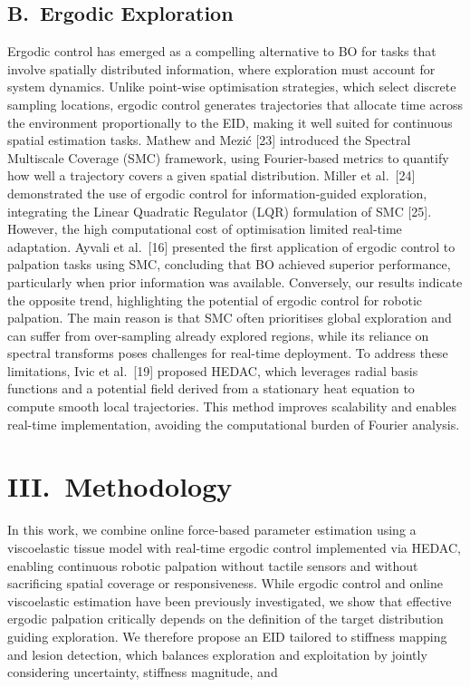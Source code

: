 \documentclass[11pt]{article}
\begin{document}
\subsection*{B.\ Ergodic Exploration}

Ergodic control has emerged as a compelling alternative to BO for
tasks that involve spatially distributed information, where
exploration must account for system dynamics. Unlike point-wise
optimisation strategies, which select discrete sampling locations,
ergodic control generates trajectories that allocate time across the
environment proportionally to the EID, making it well suited for
continuous spatial estimation tasks. Mathew and Mezi\'c [23]
introduced the Spectral Multiscale Coverage (SMC) framework, using
Fourier-based metrics to quantify how well a trajectory covers a
given spatial distribution. Miller et al.\ [24] demonstrated the use
of ergodic control for information-guided exploration, integrating
the Linear Quadratic Regulator (LQR) formulation of SMC [25].
However, the high computational cost of optimisation limited
real-time adaptation. Ayvali et al.\ [16] presented the first
application of ergodic control to palpation tasks using SMC,
concluding that BO achieved superior performance, particularly when
prior information was available. Conversely, our results indicate
the opposite trend, highlighting the potential of ergodic control
for robotic palpation. The main reason is that SMC often prioritises
global exploration and can suffer from over-sampling already explored
regions, while its reliance on spectral transforms poses challenges
for real-time deployment. To address these limitations, Ivic et al.\
[19] proposed HEDAC, which leverages radial basis functions and a
potential field derived from a stationary heat equation to compute
smooth local trajectories. This method improves scalability and
enables real-time implementation, avoiding the computational burden
of Fourier analysis.

\section*{III.\ Methodology}

In this work, we combine online force-based parameter estimation
using a viscoelastic tissue model with real-time ergodic control
implemented via HEDAC, enabling continuous robotic palpation without
tactile sensors and without sacrificing spatial coverage or
responsiveness. While ergodic control and online viscoelastic
estimation have been previously investigated, we show that effective
ergodic palpation critically depends on the definition of the target
distribution guiding exploration. We therefore propose an EID
tailored to stiffness mapping and lesion detection, which balances
exploration and exploitation by jointly considering uncertainty,
stiffness magnitude, and
\end{document}
